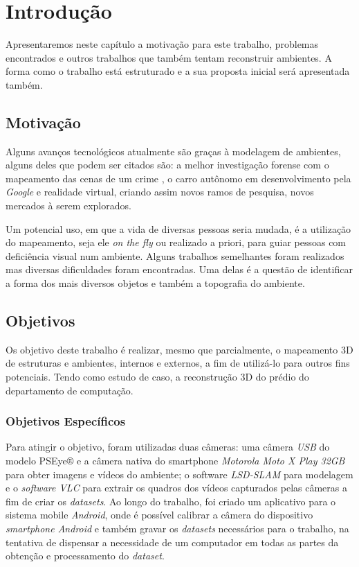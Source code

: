 \chapter{Introdução}

Apresentaremos neste capítulo a motivação para este trabalho, problemas encontrados e outros trabalhos que também tentam reconstruir ambientes. A forma como o trabalho está estruturado e a sua proposta inicial será apresentada também.

\section{Motivação}

Alguns avanços tecnológicos atualmente são graças à modelagem de ambientes, alguns deles que podem ser citados são: a melhor investigação forense com o mapeamento das cenas de um crime \cite{FIT3D}, o carro autônomo em desenvolvimento pela \textit{Google} \cite{googlex} e realidade virtual, criando assim novos ramos de pesquisa, novos mercados à serem explorados.

Um potencial uso, em que a vida de diversas pessoas seria mudada, é a utilização do mapeamento, seja ele \textit{on the fly} ou realizado a priori, para guiar pessoas com deficiência visual num ambiente. Alguns trabalhos semelhantes foram realizados mas diversas dificuldades foram encontradas. Uma delas é a questão de identificar a forma dos mais diversos objetos e também a topografia do ambiente. 


\section{Objetivos}

Os objetivo deste trabalho é realizar, mesmo que parcialmente, o mapeamento 3D de estruturas e ambientes, internos e externos, a fim de utilizá-lo para outros fins potenciais. Tendo como estudo de caso, a reconstrução 3D do prédio do departamento de computação.

\subsection{Objetivos Específicos}

Para atingir o objetivo, foram utilizadas duas câmeras: uma câmera \textit{USB} do modelo PSEye® e a câmera nativa do smartphone \textit{Motorola Moto X Play 32GB} para obter imagens e vídeos do ambiente; o software \textit{LSD-SLAM} \cite{LSD-SLAM-Artigo} para modelagem e o \textit{software VLC} para extrair os quadros dos vídeos capturados pelas câmeras a fim de criar os \textit{datasets}. Ao longo do trabalho, foi criado um aplicativo para o sistema mobile \textit{Android}, onde é possível calibrar a câmera do dispositivo \textit{smartphone Android} e também gravar os \textit{datasets} necessários para o trabalho, na tentativa de dispensar a necessidade de um computador em todas as partes da obtenção e processamento do \textit{dataset}.


